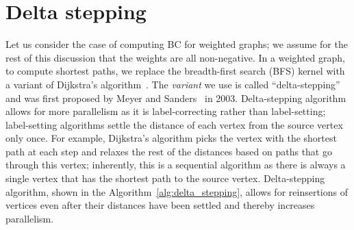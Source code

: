 \section{Delta stepping}
\label{sec:delta_stepping}
%
Let us consider the case of computing BC for weighted graphs; we assume for 
the rest of this discussion that the weights are all non-negative.
%
In a weighted graph, to compute shortest paths, we replace the breadth-first 
search (BFS) kernel with a variant of Dijkstra's algorithm~\cite{dijkstra59}.
%
The \textit{variant} we use is called ``delta-stepping'' and was first proposed
by Meyer and Sanders~\cite{meyer-diss} in 2003.
%
Delta-stepping algorithm allows for more parallelism as it is label-correcting
rather than label-setting; label-setting algorithms settle the distance of 
each vertex from the source vertex only once.
%
For example, Dijkstra's algorithm picks the vertex with the shortest path at 
each step and relaxes the rest of the distances based on paths that go through
this vertex; inherently, this is a sequential algorithm as there is always a 
single vertex that has the shortest path to the source vertex.
%
Delta-stepping algorithm, shown in the Algorithm~\ref{alg:delta_stepping}, 
allows for reinsertions of vertices even after their distances have been 
settled and thereby increases parallelism.
